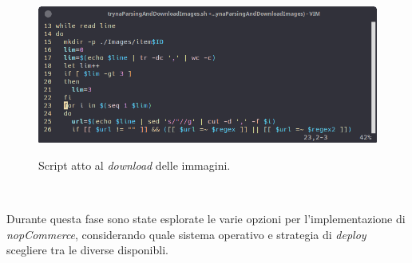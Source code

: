 \documentclass[a4paper]{report}
\begin{document}
		\begin{figure}[H]
			\includegraphics[width=\textwidth]{Script.png}\label{fig:script}
			\caption \\Script atto al \emph{download} delle immagini.
		\end{figure}

		Durante questa fase sono state esplorate le varie opzioni per l'implementazione di \emph{nopCommerce},
		considerando quale sistema operativo e strategia di \emph{deploy} scegliere tra le diverse disponibli.
\end{document}
